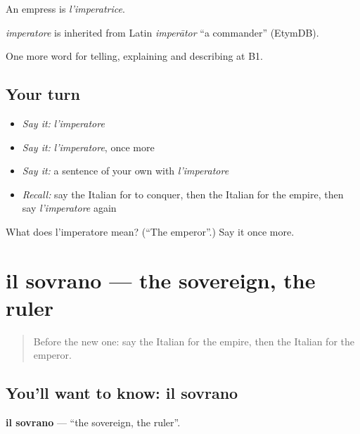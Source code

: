An empress is \emph{l'imperatrice}.

\begin{cousinweb}
\emph{imperatore} is inherited from Latin \emph{imperātor} \textquotedblleft{}a commander\textquotedblright{} (EtymDB).
\end{cousinweb}

\begin{grammarlens}[title={What you've built}]
One more word for telling, explaining and describing at B1.
\end{grammarlens}

\subsection*{Your turn}
\begin{itemize}
\raggedright
  \item \emph{Say it:} \emph{l'imperatore}
  \item \emph{Say it:} \emph{l'imperatore}, once more
  \item \emph{Say it:} a sentence of your own with \emph{l'imperatore}
  \item \emph{Recall:} say the Italian for to conquer, then the Italian for the empire, then say \emph{l'imperatore} again
\end{itemize}

\begin{tcolorbox}[breakable,colback=teal!4,colframe=teal!35!black,title={Before you move on}]
What does l'imperatore mean? (\textquotedblleft{}The emperor\textquotedblright{}.) Say it once more.
\end{tcolorbox}
\section[il sovrano]{il sovrano — the sovereign, the ruler}

\label{lesson:IT-C328-sovrano}



\begin{quote}
Before the new one: say the Italian for the empire, then the Italian for the emperor.
\end{quote}

\subsection*{You'll want to know: il sovrano}
\textbf{il sovrano} — \textquotedblleft{}the sovereign, the ruler\textquotedblright{}.

